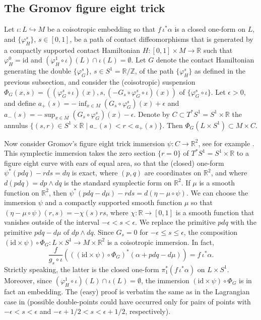 \documentclass{amsart}
\theoremstyle{remark}
\def\id{{\textrm{id}}}
\def\R{{\mathbb R}}
\def\Z{{\mathbb Z}}
\begin{document}
\subsection{The Gromov figure eight trick}
Let $\iota \colon L \hookrightarrow M$ be a coisotropic embedding so that $f \, \iota^* \alpha$ is a closed one-form on $L$, and $\{ \varphi_H^s \}$, $s \in [0, 1]$, be a path of contact diffeomorphisms that is generated by a compactly supported contact Hamiltonian $H \colon [0, 1] \times M \to \R$ such that $\varphi_H^0 = \id$ and $(\varphi_H^1 \circ \iota) (L) \cap \iota (L) = \emptyset$.
Let $G$ denote the contact Hamiltonian generating the double $\{ \varphi_G^s \}$, $s \in S^1 = \R / \Z$, of the path $\{ \varphi_H^s \}$ as defined in the previous subsection, and consider the (coisotropic) suspension $\Phi_G (x, s) = \left( (\varphi_G^s \circ \iota) (x), s, \left( - G_s \circ \varphi_G^s \circ \iota \right) (x) \right)$ of $\{ \varphi_G^s \circ \iota \}$.
Let $\epsilon > 0$, and define $a_+ (s) = - \inf_{x \in M} (G_s \circ \varphi_G^s) (x) + \epsilon$ and $a_- (s) = - \sup_{x \in M} (G_s \circ \varphi_G^s) (x) - \epsilon$.
Denote by $C \subset T^* S^1 = S^1 \times \R$ the annulus $\{ (s, r) \in S^1 \times \R \mid a_- (s) < r < a_+ (s) \}$.
Then $\Phi_G (L \times S^1) \subset M \times C$.

Now consider Gromov's figure eight trick immersion $\psi \colon C \to \R^2$, see for example \cite[Section~3.3, Step~3]{polterovich:ggs01}.
This symplectic immersion takes the zero section $\{ r = 0 \}$ of $T^* S^1 = S^1 \times \R$ to a figure eight curve with ears of equal area, so that the (closed) one-form $\psi^* (p dq) - r ds = d\eta$ is exact, where $(p, q)$ are coordinates on $\R^2$, and where $d (p dq) = dp \wedge dq$ is the standard symplectic form on $\R^2$.
If $\mu$ is a smooth function on $\R^2$, then $\psi^* (p dq - d\mu) - r ds = d(\eta - \mu \circ \psi)$.
We can choose the immersion $\psi$ and a compactly supported smooth function $\mu$ so that $(\eta - \mu \circ \psi) (r, s) = - \chi (s) r s$, where $\chi \colon \R \to [0, 1]$ is a smooth function that vanishes outside of the interval $- \epsilon < s < \epsilon$.
We replace the primitive $p dq$ with the primitive $p dq - d\mu$ of $d p \wedge dq$.
Since $G_s = 0$ for $- \epsilon \le s \le \epsilon$, the composition $(\id \times \psi) \circ \Phi_G \colon L \times S^1 \to M \times \R^2$ is a coisotropic immersion.
In fact,
\[ \frac{f}{g_s \circ \iota} \left( ((\id \times \psi) \circ \Phi_G)^* (\alpha + p dq - d\mu) \right) = f \, \iota^* \alpha. \]
Strictly speaking, the latter is the closed one-form $\pi_1^* (f \, \iota^* \alpha)$ on $L \times S^1$.
Moreover, since $(\varphi_H^1 \circ \iota) (L) \cap \iota (L) = \emptyset$, the immersion $(\id \times \psi) \circ \Phi_G$ is in fact an embedding.
The (easy) proof is verbatim the same as in the Lagrangian case in \cite[Section~3.3, Step~5]{polterovich:ggs01} (possible double-points could have occurred only for pairs of points with $- \epsilon < s < \epsilon$ and $- \epsilon + 1 / 2 < s < \epsilon + 1 / 2$, respectively).
\end{document}
